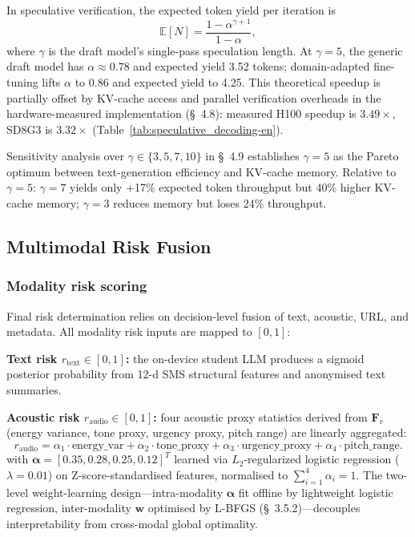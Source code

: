 \documentclass[11pt, a4paper]{article}
\begin{document}
In speculative verification, the expected token yield per iteration is
\begin{equation}
\mathbb{E}[N] = \frac{1-\alpha^{\gamma+1}}{1-\alpha},
\end{equation}
where $\gamma$ is the draft model's single-pass speculation length. At $\gamma = 5$, the generic draft model has $\alpha\approx 0.78$ and expected yield 3.52 tokens; domain-adapted fine-tuning lifts $\alpha$ to 0.86 and expected yield to 4.25. This theoretical speedup is partially offset by KV-cache access and parallel verification overheads in the hardware-measured implementation (\S~4.8): measured H100 speedup is $3.49\times$, SD8G3 is $3.32\times$ (Table~\ref{tab:speculative_decoding-en}).

Sensitivity analysis over $\gamma\in\{3,5,7,10\}$ in \S~4.9 establishes $\gamma = 5$ as the Pareto optimum between text-generation efficiency and KV-cache memory. Relative to $\gamma = 5$: $\gamma = 7$ yields only +17\% expected token throughput but 40\% higher KV-cache memory; $\gamma = 3$ reduces memory but loses 24\% throughput.

\subsection{Multimodal Risk Fusion}

\subsubsection{Modality risk scoring}

Final risk determination relies on decision-level fusion of text, acoustic, URL, and metadata. All modality risk inputs are mapped to $[0, 1]$:

\textbf{Text risk $r_{\mathrm{text}}\in[0,1]$:} the on-device student LLM produces a sigmoid posterior probability from 12-d SMS structural features and anonymised text summaries.

\textbf{Acoustic risk $r_{\mathrm{audio}}\in[0,1]$:} four acoustic proxy statistics derived from $\bm{F}_v$ (energy variance, tone proxy, urgency proxy, pitch range) are linearly aggregated:
\begin{equation}
r_{\mathrm{audio}} = \alpha_1\cdot\text{energy\_var} + \alpha_2\cdot\text{tone\_proxy} + \alpha_3\cdot\text{urgency\_proxy} + \alpha_4\cdot\text{pitch\_range}.
\end{equation}
with $\bm{\alpha} = [0.35, 0.28, 0.25, 0.12]^T$ learned via $L_2$-regularized logistic regression ($\lambda = 0.01$) on Z-score-standardised features, normalised to $\sum_{i=1}^4\alpha_i = 1$. The two-level weight-learning design---intra-modality $\bm{\alpha}$ fit offline by lightweight logistic regression, inter-modality $\mathbf{w}$ optimised by L-BFGS (\S~3.5.2)---decouples interpretability from cross-modal global optimality.
\end{document}
